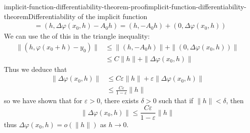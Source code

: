 \documentclass[preview]{standalone}
\begin{document}
\begin{snippetproof}{implicit-function-differentiability-theorem-proof}{implicit-function-differentiability-theorem}{Differentiability of the implicit function}
\begin{align*}
        &= (h, \Delta \varphi(x_0, h) - A_0 h) = (h, -A_0 h) + (0, \Delta \varphi(x_0, h))
    \end{align*}
    We can use the \norm of this in the triangle inequality:
    \begin{align*}
        \|(h, \varphi(x_0 + h) - y_0)\| &\leq \|(h, -A_0 h)\| + \|(0, \Delta \varphi(x_0, h))\| \\
        &\leq C\|h\| + \|\Delta \varphi(x_0, h)\|
    \end{align*}
    Thus we deduce that
    \begin{align*}
        \|\Delta \varphi(x_0, h)\| &\leq C\varepsilon\|h\| + \varepsilon\|\Delta \varphi(x_0, h)\| \\
        &\leq \frac{C\varepsilon}{1 - \varepsilon}\|h\|
    \end{align*}
    so we have shown that for \(\varepsilon > 0\), there exists \(\delta > 0\)
    such that if \(\|h\| < \delta\), then
    \[
        \|\Delta \varphi(x_0, h)\| \leq \frac{C\varepsilon}{1 - \varepsilon}\|h\|
    \]
    thus \(\Delta \varphi(x_0, h) = o(\|h\|)\) as \(h \to 0\).
\end{snippetproof}
\end{document}
